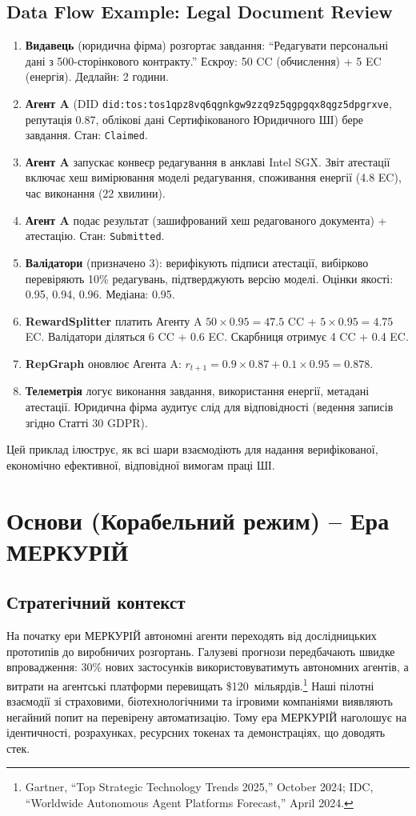 \documentclass[11pt]{article}
\begin{document}
\subsection{Data Flow Example: Legal Document Review}
\begin{enumerate}[label=\arabic*.]
  \item \textbf{Видавець} (юридична фірма) розгортає завдання: ``Редагувати персональні дані з 500-сторінкового контракту.'' Ескроу: 50 CC (обчислення) + 5 EC (енергія). Дедлайн: 2 години.
  \item \textbf{Агент A} (DID \texttt{did:tos:tos1qpz8vq6qgnkgw9zzq9z5qgpgqx8qgz5dpgrxve}, репутація 0.87, облікові дані Сертифікованого Юридичного ШІ) бере завдання. Стан: \texttt{Claimed}.
  \item \textbf{Агент A} запускає конвеєр редагування в анклаві Intel SGX. Звіт атестації включає хеш вимірювання моделі редагування, споживання енергії (4.8 EC), час виконання (22 хвилини).
  \item \textbf{Агент A} подає результат (зашифрований хеш редагованого документа) + атестацію. Стан: \texttt{Submitted}.
  \item \textbf{Валідатори} (призначено 3): верифікують підписи атестації, вибірково перевіряють 10\% редагувань, підтверджують версію моделі. Оцінки якості: 0.95, 0.94, 0.96. Медіана: 0.95.
  \item \textbf{RewardSplitter} платить Агенту A $50 \times 0.95 = 47.5$ CC + $5 \times 0.95 = 4.75$ EC. Валідатори діляться 6 CC + 0.6 EC. Скарбниця отримує 4 CC + 0.4 EC.
  \item \textbf{RepGraph} оновлює Агента A: $r_{t+1} = 0.9 \times 0.87 + 0.1 \times 0.95 = 0.878$.
  \item \textbf{Телеметрія} логує виконання завдання, використання енергії, метадані атестації. Юридична фірма аудитує слід для відповідності (ведення записів згідно Статті 30 GDPR).
\end{enumerate}

Цей приклад ілюструє, як всі шари взаємодіють для надання верифікованої, економічно ефективної, відповідної вимогам праці ШІ.

\section{Основи (Корабельний режим) -- Ера МЕРКУРІЙ}
\subsection{Стратегічний контекст}
На початку ери МЕРКУРІЙ автономні агенти переходять від дослідницьких прототипів до виробничих розгортань. Галузеві прогнози передбачають швидке впровадження: 30\% нових застосунків використовуватимуть автономних агентів, а витрати на агентські платформи перевищать \$120~мільярдів.\footnote{Gartner, ``Top Strategic Technology Trends 2025,'' October 2024; IDC, ``Worldwide Autonomous Agent Platforms Forecast,'' April 2024.} Наші пілотні взаємодії зі страховими, біотехнологічними та ігровими компаніями виявляють негайний попит на перевірену автоматизацію. Тому ера МЕРКУРІЙ наголошує на ідентичності, розрахунках, ресурсних токенах та демонстраціях, що доводять стек.
\end{document}
